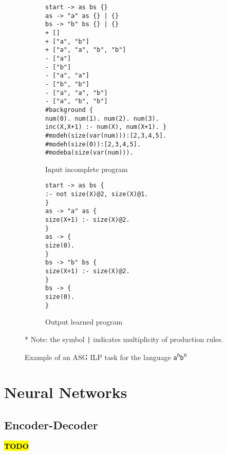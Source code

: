 \begin{figure}[H]
\centering
\begin{subfigure}{0.55\textwidth}
\texttt{start -> as bs \{\} \\
as -> "a" as \{\} | \{\} \\
bs -> "b" bs \{\} | \{\} \\
\newline
+ [] \\
+ ["a", "b"] \\
+ ["a", "a", "b", "b"] \\
- ["a"] \\
- ["b"] \\
- ["a", "a"] \\
- ["b", "b"] \\
- ["a", "a", "b"] \\
- ["a", "b", "b"] \\
\newline
\#background \{ \\
num(0). num(1). num(2). num(3). \\
inc(X,X+1) :- num(X), num(X+1). \} \\
\newline
\#modeh(size(var(num))):[2,3,4,5]. \\
\#modeh(size(0)):[2,3,4,5]. \\
\#modeba(size(var(num))). \\}
\caption{Input incomplete program}
\end{subfigure}
\begin{subfigure}{0.44\textwidth}
\texttt{start -> as bs \{ \\
\phantom{ }:- not size(X)@2, size(X)@1. \\
\} \\
\newline
as -> "a" as \{ \\
\phantom{ }size(X+1) :- size(X)@2. \\
\} \\
\newline
as -> \{ \\
\phantom{ }size(0). \\
\} \\
\newline
bs -> "b" bs \{ \\
\phantom{ }size(X+1) :- size(X)@2. \\
\} \\
\newline
bs -> \{ \\
\phantom{ }size(0). \\
\}} \\
\caption{Output learned program}
\end{subfigure}
\newline
\newline
* Note: the symbol \texttt{|} indicates multiplicity of production rules.
\caption{Example of an ASG ILP task for the language \texttt{a\textsuperscript{n}b\textsuperscript{n}}}
\label{fig:asg_ilp_example}
\end{figure}

\section{Neural Networks}

\subsection{Encoder-Decoder}

\textcolor{red}{\textbf{\hl{TODO}}}